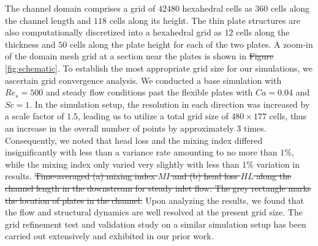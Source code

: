 \documentclass[%
aip,
amsmath,amssymb,
reprint,
]{revtex4-1}
\providecommand{\DIFadd}[1]{{\protect\color{blue}\uwave{#1}}} %
\providecommand{\DIFdel}[1]{{\protect\color{red}\sout{#1}}}                      %
\providecommand{\DIFaddbegin}{} %
\providecommand{\DIFaddend}{} %
\providecommand{\DIFdelbegin}{} %
\providecommand{\DIFdelend}{} %
\providecommand{\DIFdelFL}[1]{\DIFdel{#1}} %
\newcommand{\DIFscaledelfig}{0.5}
\newlength{\DIFdelgraphicswidth} %
\newlength{\DIFdelgraphicsheight} %
\newcommand{\DIFaddincludegraphics}[2][]{{\color{blue}\fbox{\DIFOincludegraphics[#1]{#2}}}} %
\newcommand{\DIFdelincludegraphics}[2][]{%
\sbox{\DIFdelgraphicsbox}{\DIFOincludegraphics[#1]{#2}}%
\settoboxwidth{\DIFdelgraphicswidth}{\DIFdelgraphicsbox} %
\settoboxtotalheight{\DIFdelgraphicsheight}{\DIFdelgraphicsbox} %
\scalebox{\DIFscaledelfig}{%
\parbox[b]{\DIFdelgraphicswidth}{\usebox{\DIFdelgraphicsbox}\\[-\baselineskip] \rule{\DIFdelgraphicswidth}{0em}}\llap{\resizebox{\DIFdelgraphicswidth}{\DIFdelgraphicsheight}{%
\setlength{\unitlength}{\DIFdelgraphicswidth}%
\begin{picture}(1,1)%
\thicklines\linethickness{2pt} %
{\color[rgb]{1,0,0}\put(0,0){\framebox(1,1){}}}%
{\color[rgb]{1,0,0}\put(0,0){\line( 1,1){1}}}%
{\color[rgb]{1,0,0}\put(0,1){\line(1,-1){1}}}%
\end{picture}%
}\hspace*{3pt}}} %
} %
\DeclareRobustCommand{\DIFaddbegin}{\DIFOaddbegin \let\includegraphics\DIFaddincludegraphics} %
\DeclareRobustCommand{\DIFaddend}{\DIFOaddend \let\includegraphics\DIFOincludegraphics} %
\DeclareRobustCommand{\DIFdelbegin}{\DIFOdelbegin \let\includegraphics\DIFdelincludegraphics} %
\DeclareRobustCommand{\DIFdelend}{\DIFOaddend \let\includegraphics\DIFOincludegraphics} %
\begin{document}
	\DIFaddend The channel domain comprises a grid of $42480$ hexahedral cells as $360$ cells along the channel length and $118$ cells along its height. The thin plate structures are also computationally discretized into a hexahedral grid as $12$ cells along the thickness and $50$ cells along the plate height for each of the two plates. A zoom-in of the domain mesh grid at a section near the plates is shown in \DIFdelbegin \DIFdel{Figure }\DIFdelend \DIFaddbegin \DIFadd{Fig. }\DIFaddend \ref{fig:schematic}. To establish the most appropriate grid size for our simulations, we ascertain grid convergence analysis. We conducted a base simulation with $Re_s=500$ and steady flow conditions past the flexible plates with $Ca=0.04$ and $Sc=1$. In the simulation setup, the resolution in each direction was increased by a scale factor of $1.5$, leading us to utilize a total grid size of $480 \times 177$ cells, thus an increase in the overall number of points by approximately $3$ times. Consequently, we noted that head loss and the mixing index differed insignificantly with less than a variance rate amounting to no more than $1\%$, while the mixing index only varied very slightly with less than 1\% variation in results. \DIFdelbegin %
{%
\DIFdelFL{Time-averaged (a) mixing index $MI$ and (b) head loss $HL$ along the channel length in the downstream for steady inlet flow. The grey rectangle marks the location of plates in the channel.}}
\DIFdelend Upon analyzing the results, we found that the flow and structural dynamics are well resolved at the present grid size. The grid refinement test and validation study on a similar simulation setup has been carried out extensively and exhibited in our prior work\cite{Self2019}. 
\end{document}
